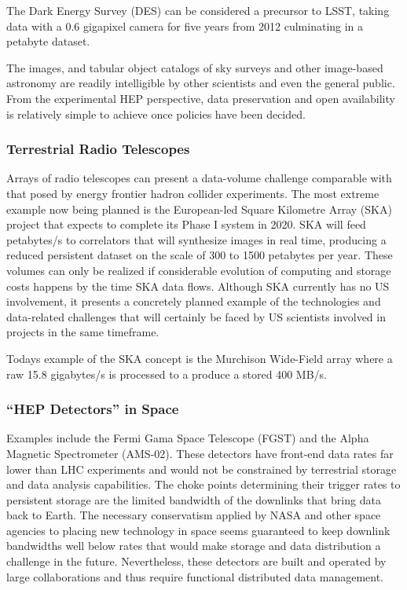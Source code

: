 The Dark Energy Survey (DES) can be considered a precursor to LSST, taking data with a 
0.6 gigapixel camera for five years from 2012 culminating in a petabyte dataset.

The images, and tabular object catalogs of sky surveys and other image-based astronomy 
are readily intelligible by other scientists and even the general public.  From the 
experimental HEP perspective, data preservation and open availability is relatively 
simple to achieve once policies have been decided.

\subsubsection{Terrestrial Radio Telescopes}
Arrays of radio telescopes can present a data-volume challenge comparable with that 
posed by energy frontier hadron collider experiments.  The most extreme example now being 
planned is the European-led Square Kilometre Array (SKA) project that expects to complete 
its Phase I system in 2020. SKA will feed petabytes/s to correlators that will synthesize 
images in real time, producing a reduced persistent dataset on the scale of 300 to 1500 
petabytes per year.  These volumes can only be realized if considerable evolution of 
computing and storage costs happens by the time SKA data flows.  Although SKA currently 
has no US involvement, it presents a concretely planned example of the technologies and 
data-related challenges that will certainly be faced by US scientists involved in projects 
in the same timeframe.

Todays example of the SKA concept is the Murchison Wide-Field array where a raw 
15.8 gigabytes/s is processed to a produce a stored 400 MB/s.

\subsubsection{“HEP Detectors” in Space}
Examples include the Fermi Gama Space Telescope (FGST) and the Alpha Magnetic 
Spectrometer (AMS-02).  These detectors have front-end data rates far lower than 
LHC experiments and would not be constrained by terrestrial storage and data analysis 
capabilities.  The choke points determining their trigger rates to persistent storage 
are the limited bandwidth of the downlinks that bring data back to Earth.  The 
necessary conservatism applied by NASA and other space agencies to placing new 
technology in space seems guaranteed to keep downlink bandwidths well below rates 
that would make storage and data distribution a challenge in the future.  
Nevertheless, these detectors are built and operated by large collaborations and 
thus require functional distributed data management.

